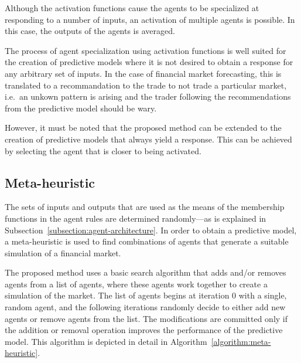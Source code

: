 \documentclass{ieeeaccess}
\begin{document}
Although the activation functions cause the agents to be specialized at
responding to a number of inputs, an activation of multiple agents is
possible. In this case, the outputs of the agents is averaged. %

The process of agent specialization using activation functions is well suited
for the creation of predictive models where it is not desired to obtain a
response for any arbitrary set of inputs. In the case of financial market
forecasting, this is translated to a recommandation to the trade to not trade a
particular market, i.e.\ an unkown pattern is arising and the trader following
the recommendations from the predictive model should be wary.

However, it must be noted that the proposed method can be extended to the
creation of predictive models that always yield a response. This can be
achieved by selecting the agent that is closer to being activated.


\subsection{Meta-heuristic}
\label{subsection:meta-heuristic}

The sets of inputs and outputs that are used as the means of the
membership functions in the agent rules are determined randomly---as
is explained in Subsection~\ref{subsection:agent-architecture}. In
order to obtain a predictive model, a meta-heuristic is used to find
combinations of agents that generate a suitable simulation of a
financial market.

The proposed method uses a basic search algorithm that adds and/or removes
agents from a list of agents, where these agents work together to create a
simulation of the market. The list of agents begins at iteration 0 with a
single, random agent, and the following iterations randomly decide to either
add new agents or remove agents from the list. The modifications are committed
only if the addition or removal operation improves the performance of the
predictive model. This algorithm is depicted in detail in
Algorithm~\ref{algorithm:meta-heuristic}.
\end{document}
